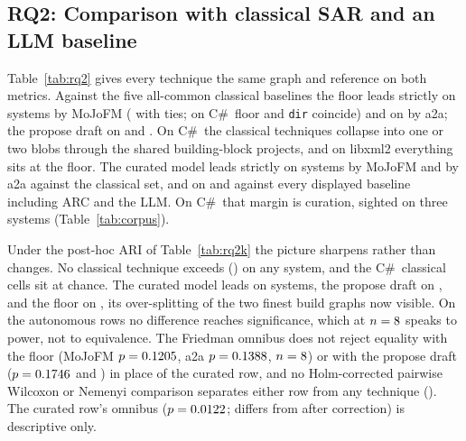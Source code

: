 \subsection{RQ2: Comparison with classical SAR and an LLM baseline}
\label{sec:rq2}

Table~\ref{tab:rq2} gives every technique the same graph and reference on both metrics. Against
the five all-common classical baselines the floor leads strictly on \rqTwoFloorMoJoWins{} systems
by MoJoFM (\rqTwoFloorMoJoWinsOrTies{} with ties; on C\#\ floor and \texttt{dir} coincide) and on
\rqTwoFloorAtoAWins{} by a2a; the propose draft on \rqTwoProposeMoJoWins{} and
\rqTwoProposeAtoAWins{}. On C\#\ the classical techniques collapse into one or two blobs through
the shared building-block projects, and on libxml2 everything sits at the floor. The curated
model leads strictly on \rqTwoPipelineMoJoWins{} systems by MoJoFM and \rqTwoPipelineAtoAWins{} by
a2a against the classical set, and on \rqTwoPipelineMoJoWinsAll{} and \rqTwoPipelineAtoAWinsAll{}
against every displayed baseline including ARC and the LLM. On C\#\ that margin is curation,
sighted on three systems (Table~\ref{tab:corpus}).

Under the post-hoc ARI of Table~\ref{tab:rq2k} the picture sharpens rather than changes. No
classical technique exceeds \rqTwoSarAriMax{} (\rqTwoSarAriMaxWhere{}) on any system, and the
C\#\ classical cells sit at chance. The curated model leads on \rqTwoPipelineAriWins{} systems,
the propose draft on \rqTwoProposeAriWins{}, and the floor on \rqTwoFloorAriWins{}, its
over-splitting of the two finest build graphs now visible. On the autonomous rows no difference
reaches significance, which at $n=8{}$ speaks to power, not to equivalence.
The Friedman omnibus does not reject equality with the floor
(MoJoFM $p=0.1205$, a2a $p=0.1388$, $n=8$) or
with the propose draft ($p=0.1746$ and \rqTwoFriedmanProposeAtoAP{}) in place of
the curated row, and no Holm-corrected pairwise Wilcoxon or Nemenyi comparison separates either
row from any technique (\trStats{}). The curated row's omnibus ($p=0.0122$; differs from
\rqTwoPosthocDiffers{} after correction) is descriptive only.

